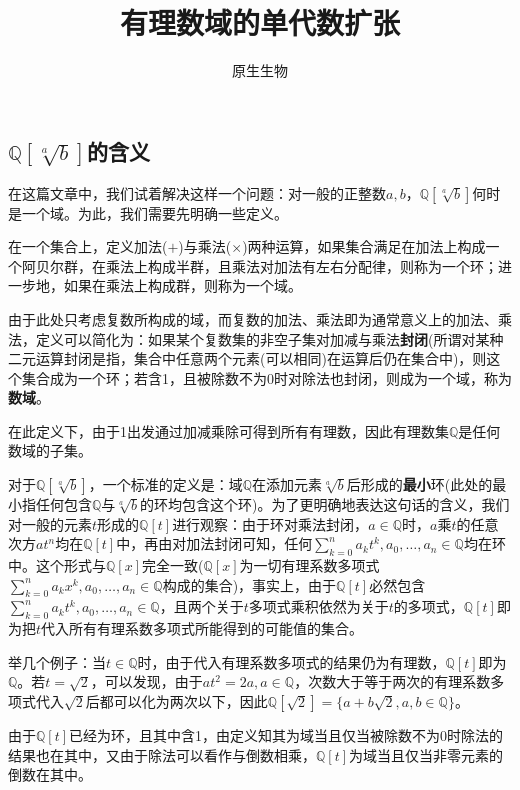 \documentclass[UTF8]{ctexart}
\title{\heiti 有理数域的单代数扩张}
\author{原生生物}
\begin{document}
\maketitle

\subsection{$\mathbb{Q}[\sqrt[a]b]$的含义}
在这篇文章中，我们试着解决这样一个问题：对一般的正整数$a,b$，$\mathbb{Q}[\sqrt[a]b]$何时是一个域。为此，我们需要先明确一些定义。

在一个集合上，定义加法($+$)与乘法($\times$)两种运算，如果集合满足在加法上构成一个阿贝尔群，在乘法上构成半群，且乘法对加法有左右分配律，则称为一个环；进一步地，如果在乘法上构成群，则称为一个域。

由于此处只考虑复数所构成的域，而复数的加法、乘法即为通常意义上的加法、乘法，定义可以简化为：如果某个复数集的非空子集对加减与乘法\textbf{封闭}(所谓对某种二元运算封闭是指，集合中任意两个元素(可以相同)在运算后仍在集合中)，则这个集合成为一个环；若含1，且被除数不为0时对除法也封闭，则成为一个域，称为\textbf{数域}。

在此定义下，由于1出发通过加减乘除可得到所有有理数，因此有理数集$\mathbb{Q}$是任何数域的子集。

对于$\mathbb{Q}[\sqrt[a]b]$，一个标准的定义是：域$\mathbb{Q}$在添加元素$\sqrt[a]b$后形成的\textbf{最小}环(此处的最小指任何包含$\mathbb{Q}$与$\sqrt[a]b$的环均包含这个环)。为了更明确地表达这句话的含义，我们对一般的元素$t$形成的$\mathbb{Q}[t]$进行观察：由于环对乘法封闭，$a\in\mathbb{Q}$时，$a$乘$t$的任意次方$at^n$均在$\mathbb{Q}[t]$中，再由对加法封闭可知，任何$\sum_{k=0}^na_kt^k,a_0,\dots,a_n\in\mathbb{Q}$均在环中。这个形式与$\mathbb{Q}[x]$完全一致($\mathbb{Q}[x]$为一切有理系数多项式$\sum_{k=0}^na_kx^k,a_0,\dots,a_n\in\mathbb{Q}$构成的集合)，事实上，由于$\mathbb{Q}[t]$必然包含$\sum_{k=0}^na_kt^k,a_0,\dots,a_n\in\mathbb{Q}$，且两个关于$t$多项式乘积依然为关于$t$的多项式，$\mathbb{Q}[t]$即为把$t$代入所有有理系数多项式所能得到的可能值的集合。

举几个例子：当$t\in\mathbb{Q}$时，由于代入有理系数多项式的结果仍为有理数，$\mathbb{Q}[t]$即为$\mathbb{Q}$。若$t=\sqrt{2}$，可以发现，由于$at^2=2a,a\in\mathbb{Q}$，次数大于等于两次的有理系数多项式代入$\sqrt{2}$后都可以化为两次以下，因此$\mathbb{Q}[\sqrt2]=\{a+b\sqrt2,a,b\in\mathbb{Q}\}$。

由于$\mathbb{Q}[t]$已经为环，且其中含1，由定义知其为域当且仅当被除数不为0时除法的结果也在其中，又由于除法可以看作与倒数相乘，$\mathbb{Q}[t]$为域当且仅当非零元素的倒数在其中。
\end{document}
